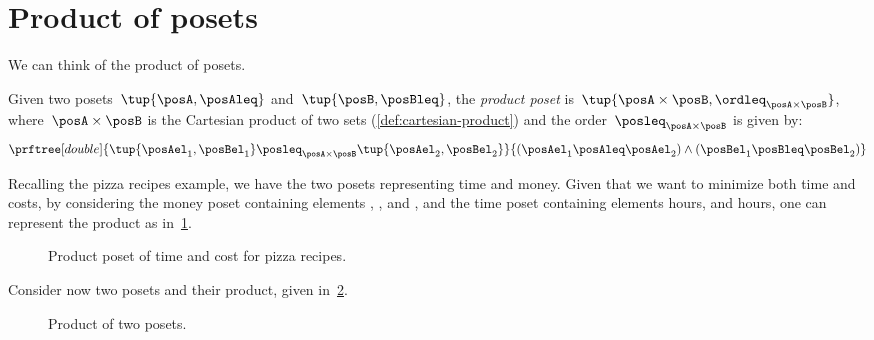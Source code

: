 
\section{Product of posets}
We can think of the product of posets.

\begin{definition}
  \label{def:productposet}
  Given two posets~$\tup{\posA, \posAleq}$
  and~$\tup{\posB, \posBleq}$, the \emph{product poset} is~$\tup{\posA \times \posB, \ordleq_{\posA\times \posB}}$, where~$\posA \times \posB$ is the Cartesian product of two sets (\cref{def:cartesian-product}) and the order~$\posleq_{\posA \times \posB}$ is given by:
  \begin{equation}
    \prftree[double]{\tup{\posAel_1, \posBel_1}
    \posleq_{\posA\times \posB}
    \tup{\posAel_2, \posBel_2}}{(\posAel_1 \posAleq \posAel_2) \wedge
    (\posBel_1 \posBleq \posBel_2)}
  \end{equation}
\end{definition}
Recalling the pizza recipes example, we have the two posets representing time and money.
Given that we want to minimize both time and costs, by considering the money poset containing elements \unit[1]{\stdcurr}, \unit[2]{\stdcurr}, and \unit[3]{\stdcurr}, and the time poset containing elements \unit[1]{hours}, and \unit[2]{hours}, one can represent the product as in~\cref{fig:productpizza}.

\begin{figure}[h!]
  \begin{center}
  \end{center}
  \caption{Product poset of time and cost for pizza recipes.}
  \label{fig:productpizza}
\end{figure}


\begin{example}
  Consider now two posets and their product, given in~\cref{fig:composing_posets_1}.
  \begin{figure}[h!]
    \begin{center}
    \end{center}
    \caption{Product of two posets.\label{fig:composing_posets_1}}
  \end{figure}
\end{example}
